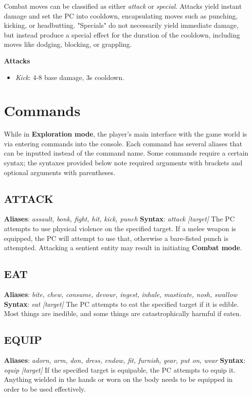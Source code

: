 \documentclass[11pt]{article}
\begin{document}
	Combat moves can be classified as either \textit{attack} or \textit{special}. Attacks yield instant damage and set the PC into cooldown, encapsulating moves such as punching, kicking, or headbutting. "Specials" do not necessarily yield immediate damage, but instead produce a special effect for the duration of the cooldown, including moves like dodging, blocking, or grappling.
	
	\textbf{Attacks}
	
	\begin{itemize}
		\item \textit{Kick}: 4-8 base damage, 3s cooldown.
	\end{itemize}
	
	\section{Commands}
	While in \textbf{Exploration mode}, the player's main interface with the game world is via entering commands into the console. Each command has several aliases that can be inputted instead of the command name. Some commands require a certain syntax; the syntaxes provided below note required arguments with brackets and optional arguments with parentheses.
	\subsection{ATTACK}
	\textbf{Aliases}: \textit{assault, bonk, fight, hit, kick, punch}\newline
	\textbf{Syntax}: \textit{attack [target]}\newline
	The PC attempts to use physical violence on the specified target. If a melee weapon is equipped, the PC will attempt to use that, otherwise a bare-fisted punch is attempted. Attacking a sentient entity may result in initiating \textbf{Combat mode}.
	\subsection{EAT}
	\textbf{Aliases}: \textit{bite, chew, consume, devour, ingest, inhale, masticate, nosh, swallow}\newline
	\textbf{Syntax}: \textit{eat [target]}\newline
	The PC attempts to eat the specified target if it is edible. Most things are inedible, and some things are catastrophically harmful if eaten.
	\subsection{EQUIP}
	\textbf{Aliases}: \textit{adorn, arm, don, dress, endow, fit, furnish, gear, put on, wear}\newline
	\textbf{Syntax}: \textit{equip [target]}\newline
	If the specified target is equipable, the PC attempts to equip it. Anything wielded in the hands or worn on the body needs to be equipped in order to be used effectively.
\end{document}

